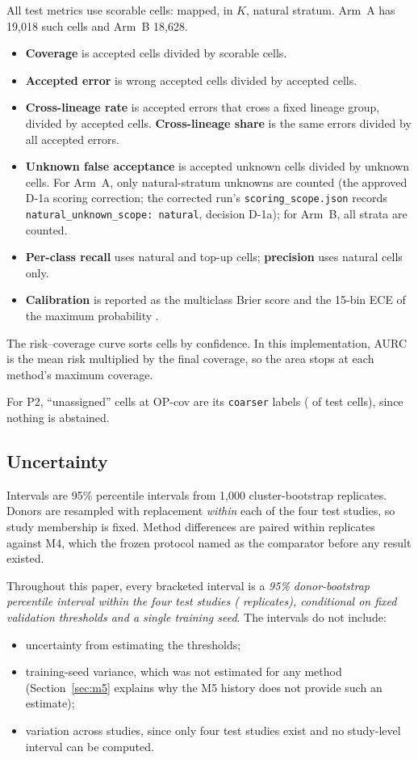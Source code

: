 \documentclass[11pt]{article}
\begin{document}
All test metrics use scorable cells: mapped, in $K$, natural stratum. Arm~A has 19{,}018 such cells and Arm~B 18{,}628.
\begin{itemize}
\item \textbf{Coverage} is accepted cells divided by scorable cells.
\item \textbf{Accepted error} is wrong accepted cells divided by accepted cells.
\item \textbf{Cross-lineage rate} is accepted errors that cross a fixed lineage group, divided by accepted cells. \textbf{Cross-lineage share} is the same errors divided by all accepted errors.
\item \textbf{Unknown false acceptance} is accepted unknown cells divided by unknown cells. For Arm~A, only natural-stratum unknowns are counted (the approved D-1a scoring correction; the corrected run's \nolinkurl{scoring_scope.json} records \verb|natural_unknown_scope: natural|, decision D-1a); for Arm~B, all strata are counted.
\item \textbf{Per-class recall} uses natural and top-up cells; \textbf{precision} uses natural cells only.
\item \textbf{Calibration} is reported as the multiclass Brier score and the 15-bin ECE of the maximum probability \citep{guo2017}.
\end{itemize}

\noindent The risk--coverage curve sorts cells by confidence. In this implementation, AURC is the mean risk multiplied by the final coverage, so the area stops at each method's maximum coverage.

For P2, ``unassigned'' cells at OP-cov are its \texttt{coarser} labels ( of test cells), since nothing is abstained.

\subsection{Uncertainty}\label{sec:unc}

Intervals are 95\% percentile intervals from 1{,}000 cluster-bootstrap replicates. Donors are resampled with replacement \emph{within} each of the four test studies, so study membership is fixed. Method differences are paired within replicates against M4, which the frozen protocol named as the comparator before any result existed.

Throughout this paper, every bracketed interval is a \emph{95\% donor-bootstrap percentile interval within the four test studies ( replicates), conditional on fixed validation thresholds and a single training seed}. The intervals do not include:
\begin{itemize}
\item uncertainty from estimating the thresholds;
\item training-seed variance, which was not estimated for any method (Section~\ref{sec:m5} explains why the M5 history does not provide such an estimate);
\item variation across studies, since only four test studies exist and no study-level interval can be computed.
\end{itemize}
\end{document}
